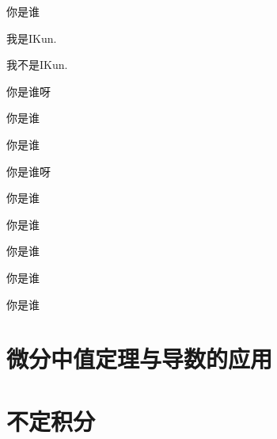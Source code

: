 \documentclass[lang=cn,10pt]{elegantbook}
\begin{document}
\begin{problemset}[错题集]
	\item 你是谁\adftripleflourishright
\end{problemset}

\begin{conclusion}
	我是IKun.
\end{conclusion}

\begin{assumption}
	我不是IKun.
\end{assumption}

\begin{property}
	你是谁呀
\end{property}

\begin{solution}
	你是谁
\end{solution}

\begin{example}
	你是谁
\end{example}

\begin{problem}
	你是谁呀
\end{problem}

\begin{exercise}
	你是谁
\end{exercise}

\begin{theorem}
	你是谁
\end{theorem}

\begin{lemma}
	你是谁
\end{lemma}

\begin{corollary}
	你是谁
\end{corollary}

\begin{axiom}
	你是谁
\end{axiom}








\chapter{微分中值定理与导数的应用}



\chapter{不定积分}
\end{document}
